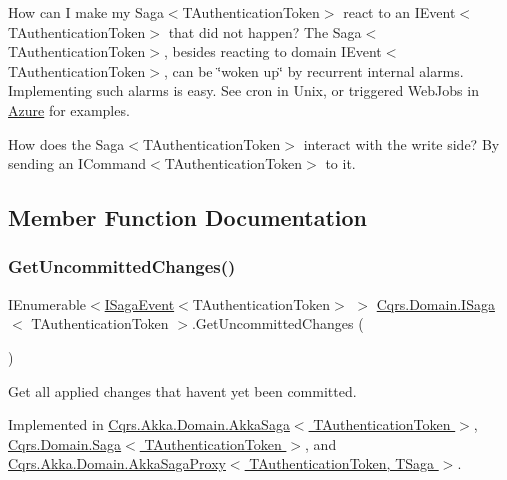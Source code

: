 How can I make my Saga$<$\+T\+Authentication\+Token$>$ react to an I\+Event$<$\+T\+Authentication\+Token$>$ that did not happen? The Saga$<$\+T\+Authentication\+Token$>$, besides reacting to domain I\+Event$<$\+T\+Authentication\+Token$>$, can be \char`\"{}woken up\char`\"{} by recurrent internal alarms. Implementing such alarms is easy. See cron in Unix, or triggered Web\+Jobs in \hyperlink{namespaceCqrs_1_1Azure}{Azure} for examples.

How does the Saga$<$\+T\+Authentication\+Token$>$ interact with the write side? By sending an I\+Command$<$\+T\+Authentication\+Token$>$ to it. 

\subsection{Member Function Documentation}
\mbox{\label{interfaceCqrs_1_1Domain_1_1ISaga_abb77811b4f7d19adb61f9d33da18e7e0_abb77811b4f7d19adb61f9d33da18e7e0}} 
\subsubsection{\texorpdfstring{Get\+Uncommitted\+Changes()}{GetUncommittedChanges()}}
{\footnotesize\ttfamily I\+Enumerable$<$\hyperlink{interfaceCqrs_1_1Events_1_1ISagaEvent}{I\+Saga\+Event}$<$T\+Authentication\+Token$>$ $>$ \hyperlink{interfaceCqrs_1_1Domain_1_1ISaga}{Cqrs.\+Domain.\+I\+Saga}$<$ T\+Authentication\+Token $>$.Get\+Uncommitted\+Changes (\begin{DoxyParamCaption}{ }\end{DoxyParamCaption})}



Get all applied changes that haven\textquotesingle{}t yet been committed. 



Implemented in \hyperlink{classCqrs_1_1Akka_1_1Domain_1_1AkkaSaga_a1fceccba498fa9f2d3db328a921da23d_a1fceccba498fa9f2d3db328a921da23d}{Cqrs.\+Akka.\+Domain.\+Akka\+Saga$<$ T\+Authentication\+Token $>$}, \hyperlink{classCqrs_1_1Domain_1_1Saga_a759b30b518c7fa5037ec4041054f349c_a759b30b518c7fa5037ec4041054f349c}{Cqrs.\+Domain.\+Saga$<$ T\+Authentication\+Token $>$}, and \hyperlink{classCqrs_1_1Akka_1_1Domain_1_1AkkaSagaProxy_a8cad3415bc5474a01bfdb2db3a852ea5_a8cad3415bc5474a01bfdb2db3a852ea5}{Cqrs.\+Akka.\+Domain.\+Akka\+Saga\+Proxy$<$ T\+Authentication\+Token, T\+Saga $>$}.

